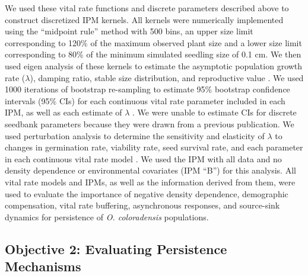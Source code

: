 \documentclass[12pt, letterpaper]{article}
\begin{document}
We used these vital rate functions and discrete parameters described above to construct discretized IPM kernels. All kernels were numerically implemented using the “midpoint rule” method \cite{Easterling2000} with 500 bins, an upper size limit corresponding to 120\% of the maximum observed plant size and a lower size limit corresponding to 80\% of the minimum simulated seedling size of 0.1 cm. We then used eigen analysis of these kernels to estimate the asymptotic population growth rate ($\lambda$), damping ratio, stable size distribution, and reproductive value \cite{Caswell2001MatrixInterpretation, Ellner2016Data-drivenPopulations}. We used 1000 iterations of bootstrap re-sampling to estimate 95\% bootstrap confidence intervals (95\% CIs) for each continuous vital rate parameter included in each IPM, as well as each estimate of $\lambda$ \cite{Merow2014AdvancingGuide, Fieberg2020Resampling-basedBiologists}. We were unable to estimate CIs for discrete seedbank parameters because they were drawn from a previous publication. We used perturbation analysis to determine the sensitivity and elasticity of $\lambda$ to changes in germination rate, viability rate, seed survival rate, and each parameter in each continuous vital rate model \cite{Morris2002QuantitativeAnalysis}. We used the IPM with all data and no density dependence or environmental covariates (IPM “B”) for this analysis. All vital rate models and IPMs, as well as the information derived from them, were used to evaluate the importance of negative density dependence, demographic compensation, vital rate buffering, asynchronous responses, and source-sink dynamics for persistence of \textit{O. coloradensis} populations.  

\subsection{Objective 2: Evaluating Persistence Mechanisms}
\end{document}
